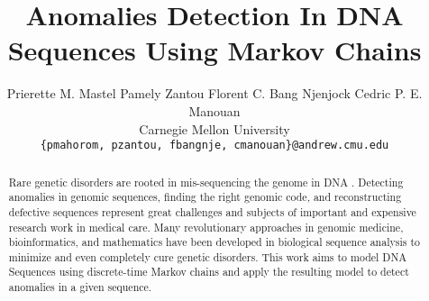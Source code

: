 \documentclass[10pt,twocolumn,letterpaper]{article}
\begin{document}
\title{Anomalies Detection In DNA Sequences Using Markov Chains}

\author{Prierette M. Mastel \quad Pamely Zantou \quad Florent C. Bang Njenjock \quad Cedric P. E. Manouan \\
Carnegie Mellon University\\
{\tt\small \{pmahorom, pzantou, fbangnje, cmanouan\}@andrew.cmu.edu}
}

\maketitle
\thispagestyle{empty}

\begin{abstract}
    Rare genetic disorders are rooted in mis-sequencing the
    genome in DNA \cite{posey}. Detecting anomalies in genomic sequences, finding the right genomic code, and reconstructing
    defective sequences represent great challenges and subjects
    of important and expensive research work in medical care.
    Many revolutionary approaches in genomic medicine, bioinformatics, and mathematics have been developed in biological
    sequence analysis to minimize and even completely cure
    genetic disorders. This work aims to model DNA Sequences
    using discrete-time Markov chains and apply the resulting model to detect anomalies in a given sequence.
\end{abstract}


\end{document}

